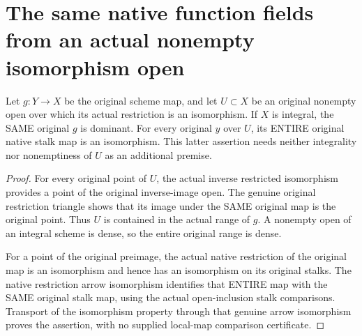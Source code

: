 \section{The same native function fields from an actual nonempty isomorphism open}
\label{sec:generic-open-function-field}

\begin{theorem}
\label{sc0-generic-open-field:original-dominance-stalks}
\leanok
Let $g:Y\to X$ be the original scheme map, and let $U\subset X$ be
an original nonempty open over which its actual restriction is an
isomorphism. If $X$ is integral, the SAME original $g$ is dominant.
For every original $y$ over $U$, its ENTIRE original native stalk map
is an isomorphism. This latter assertion needs neither integrality
nor nonemptiness of $U$ as an additional premise.
\end{theorem}
\begin{proof}
For every original point of $U$, the actual inverse restricted
isomorphism provides a point of the original inverse-image open.
The genuine original restriction triangle shows that its image under
the SAME original map is the original point. Thus $U$ is contained
in the actual range of $g$. A nonempty open of an integral scheme
is dense, so the entire original range is dense.

For a point of the original preimage, the actual native restriction
of the original map is an isomorphism and hence has an isomorphism
on its original stalks. The native restriction arrow isomorphism
identifies that ENTIRE map with the SAME original stalk map, using
the actual open-inclusion stalk comparisons. Transport of the
isomorphism property through that genuine arrow isomorphism proves
the assertion, with no supplied local-map comparison certificate.
\end{proof}

